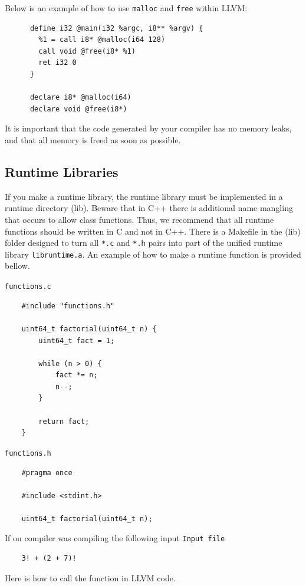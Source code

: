 \documentclass{article}
\begin{document}
     Below is an example of how to use \texttt{malloc} and \texttt{free} within LLVM:

     \begin{lstlisting}
      define i32 @main(i32 %argc, i8** %argv) {
        %1 = call i8* @malloc(i64 128)
        call void @free(i8* %1)
        ret i32 0
      }

      declare i8* @malloc(i64)
      declare void @free(i8*)
    \end{lstlisting}
    It is important that the code generated by your compiler has no memory leaks, and that all memory is freed as soon as possible.

  \subsection{Runtime Libraries} %

    If you make a runtime library, the runtime library must be implemented in a runtime directory (lib). Beware that in C++ there is additional name
    mangling that occurs to allow class functions. Thus, we recommend that all runtime functions should be written in C and not in C++. There is a
    Makefile in the (lib) folder designed to turn all \texttt{*.c} and \texttt{*.h} pairs into part of the unified runtime library
    \texttt{libruntime.a}. An example of how to make a runtime function is provided bellow.

    \texttt{functions.c}
    \begin{lstlisting}
    #include "functions.h"

    uint64_t factorial(uint64_t n) {
        uint64_t fact = 1;

        while (n > 0) {
            fact *= n;
            n--;
        }

        return fact;
    }
    \end{lstlisting}

    \texttt{functions.h}
    \begin{lstlisting}
    #pragma once

    #include <stdint.h>

    uint64_t factorial(uint64_t n);
    \end{lstlisting}

    If ou compiler was compiling the following input
    \texttt{Input file}
    \begin{lstlisting}
    3! + (2 + 7)!
    \end{lstlisting}
    Here is how to call the function in LLVM code.
\end{document}
